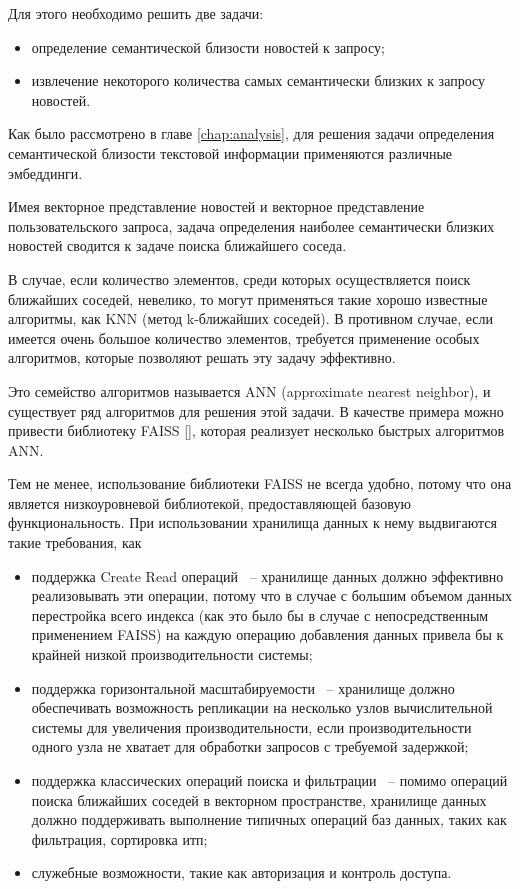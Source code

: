 Для этого необходимо решить две задачи:
\begin{itemize}
    \item определение семантической близости новостей к запросу;
    \item извлечение некоторого количества самых семантически близких к запросу новостей.
\end{itemize}

Как было рассмотрено в главе \ref{chap:analysis}, для решения задачи определения семантической близости текстовой информации применяются различные эмбеддинги.

Имея векторное представление новостей и векторное представление пользовательского запроса, задача определения наиболее семантически близких новостей сводится к задаче поиска ближайшего соседа.

В случае, если количество элементов, среди которых осуществляется поиск ближайших соседей, невелико, то могут применяться такие хорошо известные алгоритмы, как KNN (метод k-ближайших соседей). В противном случае, если имеется очень большое количество элементов, требуется применение особых алгоритмов, которые позволяют решать эту задачу эффективно.

Это семейство алгоритмов называется ANN (approximate nearest neighbor), и существует ряд алгоритмов для решения этой задачи. В качестве примера можно привести библиотеку FAISS [\cite{faiss}], которая реализует несколько быстрых алгоритмов ANN.

Тем не менее, использование библиотеки FAISS не всегда удобно, потому что она является низкоуровневой библиотекой, предоставляющей базовую функциональность. При использовании хранилища данных к нему выдвигаются такие требования, как
\begin{itemize}
    \item поддержка Create Read операций ~-- хранилище данных должно эффективно реализовывать эти операции, потому что в случае с большим объемом данных перестройка всего индекса (как это было бы в случае с непосредственным применением FAISS) на каждую операцию добавления данных привела бы к крайней низкой производительности системы;
    \item поддержка горизонтальной масштабируемости ~-- хранилище должно обеспечивать возможность репликации на несколько узлов вычислительной системы для увеличения производительности, если производительности одного узла не хватает для обработки запросов с требуемой задержкой;
    \item поддержка классических операций поиска и фильтрации ~-- помимо операций поиска ближайших соседей в векторном пространстве, хранилище данных должно поддерживать выполнение типичных операций баз данных, таких как фильтрация, сортировка итп;
    \item служебные возможности, такие как авторизация и контроль доступа.
\end{itemize}

